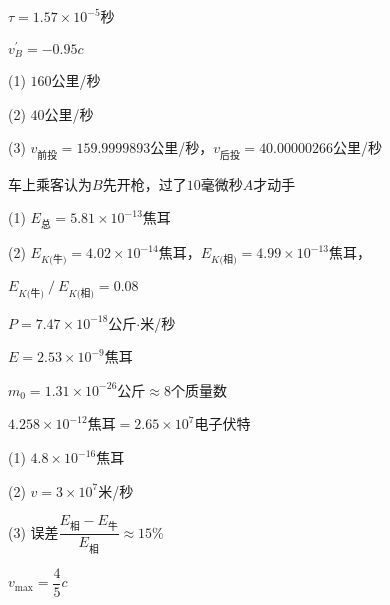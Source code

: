 \achapter

\answer $ \tau = 1 . 5 7 \times 1 0 ^ { -5 }   $秒

\answer $ v _ B ^ { \prime } = - 0 . 9 5 c  $

\addtocounter{answer}{2}
\answer (1) $ 160 $公里/秒

(2) $ 40 $公里/秒

(3) $ v_\text{前投}=159.9999893 $公里/秒，$ v_\text{后投}=40.00000266 $公里/秒

\answer 车上乘客认为$ B $先开枪，过了$ 10 $毫微秒$ A $才动手

\answer (1) $ E _ \text{总} = 5 . 8 1 \times 1 0 ^ { -13 }   $焦耳

(2) $ E _ {K \text{(牛)}} = 4 . 0 2 \times 1 0 ^ { - 14 } $焦耳，$ E _ {K \text{(相)}}=4.99\times 10^{-13} $焦耳，

\aindent $ E _ {K \text{(牛)}} \operatorname{/} E _ {K \text{(相)}} = 0 . 0 8   $


\answer $ P = 7 . 4 7 \times 1 0 ^ { - 18 }$公斤$ \cdot $米/秒

$ E = 2 . 5 3 \times 1 0 ^ { - 9 }   $焦耳

$ m _ { 0 } = 1 . 3 1 \times 1 0 ^ { -26 } $公斤$ \approx 8   $个质量数

\answer $ 4 . 2 5 8 \times 1 0 ^ { - 12 }  $焦耳$ = 2 . 6 5 \times 1 0 ^ { 7 }  $电子伏特

\answer (1) $ 4 . 8 \times 1 0 ^ { -16 }$焦耳

(2) $ v = 3 \times 1 0 ^ { 7 } $米/秒

(3) 误差$ \dfrac{E_\text{相}-E_\text{牛}}{E_\text{相}} \approx 15\% $

\answer $ v _ { \text{max} } = \dfrac { 4 } { 5 } c   $

